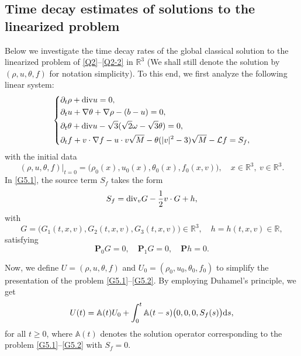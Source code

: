 \documentclass[reqno,11pt]{amsart}
\theoremstyle{plain}
\numberwithin{equation}{section}
\begin{document}
\subsection{Time decay estimates of  solutions to the linearized  problem}%
Below we investigate the time decay rates of the global classical solution 
to the linearized problem of \eqref{Q2}--\eqref{Q2-2} in $\mathbb{R}^{3}$ (We shall still denote the solution by 
$(\rho, u, \theta, f)$ for notation simplicity). To   this end, we first analyze the following linear system:  
\begin{equation}\label{G5.1}\left\{\begin{aligned}
&\partial_t \rho + {\rm div}u = 0, \\
&\partial_t u  + \nabla \theta + \nabla \rho - (b - u) = 0, \\
&\partial_t \theta + {\rm div}u - \sqrt{3}(\sqrt{2} \omega - \sqrt{3} \theta) = 0, \\
&\partial_t f + v \cdot \nabla f - u \cdot v \sqrt{M} - \theta (|v|^2 - 3) \sqrt{M} - \mathcal{L} f =  {S}_f,
\end{aligned}\right.
\end{equation}  
with the initial data  
\begin{equation}\label{G5.2}
(\rho, u, \theta, f)|_{t=0} = \big( \rho_0(x), u_0(x), \theta_0(x), f_0(x,v) \big), \quad x \in \mathbb{R}^3, \  v \in \mathbb{R}^3.
\end{equation}
In \eqref{G5.1}, the source term  ${S}_f$ takes the form  
\begin{equation*}
{S}_f = {\rm div}_v G - \frac{1}{2} v \cdot G + h,
\end{equation*}  
with  
\begin{equation*}
G = \big(G_1(t,x,v), G_2(t,x,v), G_3(t,x,v)\big) \in \mathbb{R}^3, \quad h = h(t,x,v) \in \mathbb{R},
\end{equation*}  
satisfying  
\begin{equation*}
\mathbf{P}_{0}G = 0, \quad \mathbf{P}_{1}G = 0, \quad \mathbf{P}h = 0.
\end{equation*}   

Now, we define $U=(\rho,u,\theta,f)$ and $U_0=(\rho_0,u_0,\theta_0,f_0)$ to simplify the presentation of the problem \eqref{G5.1}--\eqref{G5.2}. By employing Duhamel's principle, we get  
\begin{align}\label{G5.3}  
U(t)=\mathbb{A}(t)U_{0}+\int_{0}^{t}\mathbb{A}(t-s)\big( 0,0,0,{S}_f(s)\big){\rm d}s,  
\end{align}  
for all $t\geq 0$, where $\mathbb{A}(t)$ denotes the solution operator corresponding to 
the problem \eqref{G5.1}--\eqref{G5.2} with $ {S}_f=0$. 
\end{document}
